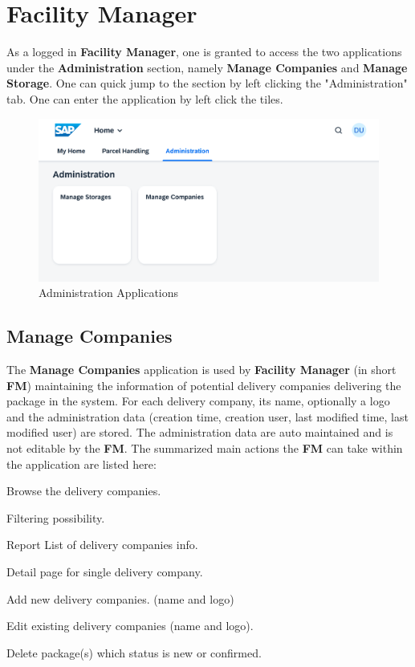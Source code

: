 \pagebreak

\section{Facility Manager}

As a logged in \textbf{Facility Manager}, one is granted to access the two applications under the \textbf{Administration} section, namely \textbf{Manage Companies} and \textbf{Manage Storage}. One can quick jump to the section by left clicking the "Administration" tab. One can enter the application by left click the tiles.

\begin{figure}[H]
	\centering
	\includegraphics[width=1\linewidth]{images/user_doc/overviews/AdminTab.png}
	\caption{Administration Applications}
	\label{fig:AdministrationApplications}
\end{figure}


\subsection{Manage Companies}

The \textbf{Manage Companies} application is used by \textbf{Facility Manager} (in short \textbf{FM}) maintaining the information of potential delivery companies delivering the package in the system. For each delivery company, its name, optionally a logo and the administration data (creation time, creation user, last modified time, last modified user) are stored. The administration data are auto maintained and is not editable by the \textbf{FM}. The summarized main actions the \textbf{FM} can take within the application are listed here:

\begin{compactenum}
	\item Browse the delivery companies.
        \begin{compactenum}
            \item Filtering possibility.
            \item Report List of delivery companies info.
            \item Detail page for single delivery company.
        \end{compactenum}
    \item Add new delivery companies. (name and logo)
    \item Edit existing delivery companies (name and logo).
    \item Delete package(s) which status is new or confirmed.
\end{compactenum}

